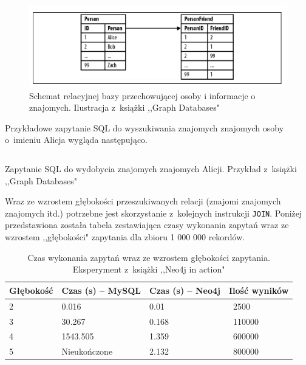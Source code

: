 \documentclass[brudnopis]{xmgr}
\begin{document}
\begin{figure}[H]
        \centering
	\includegraphics[scale=0.75]{images/relational-schema-friends.png}
	\caption{Schemat relacyjnej bazy przechowującej osoby i informacje o znajomych. Ilustracja z~książki ,,Graph Databases"\cite{Robinson:2013:GD}}
\end{figure}

Przykładowe zapytanie SQL do wyszukiwania znajomych znajomych osoby o~imieniu Alicja wygląda następująco.

\begin{listing}[H]
	\inputminted{sql}{listings/sql/relational-schema-friends-fof-query.sql}
	\caption{Zapytanie SQL do wydobycia znajomych znajomych Alicji. Przykład z~książki ,,Graph Databases"\cite{Robinson:2013:GD}}
\end{listing}

Wraz ze wzrostem głębokości przeszukiwanych relacji (znajomi znajomych znajomych itd.) potrzebne jest skorzystanie z~kolejnych instrukcji \texttt{JOIN}. Poniżej przedstawiona została tabela zestawiająca czasy wykonania zapytań wraz ze wzrostem ,,głębokości" zapytania dla zbioru 1 000 000 rekordów.

\begin{table}[H]
    \centering
    \begin{tabular}{|l|l|l|l|}
      \hline 
      \textbf{Głębokość} & \textbf{Czas (s) -- MySQL} & \textbf{Czas (s) -- Neo4j} & \textbf{Ilość wyników} \\
      \hline
      2 & 0.016 & 0.01 & {~}2500 \\
      3 & 30.267 & 0.168 & {~}110000 \\
      4 & 1543.505 & 1.359 & {~}600000 \\
      5 & Nieukończone & 2.132 & {~}800000 \\
      \hline
   \end{tabular} 
    \caption{Czas wykonania zapytań wraz ze wzrostem głębokości zapytania. Eksperyment z~książki ,,Neo4j in action"\cite{neo4jinaction}}
    \label{fig:mysqlvsneo4j_results}
\end{table}
\end{document}
